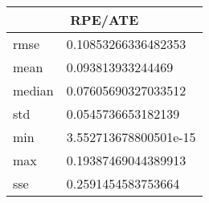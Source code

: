 \begin{table}[!ht] 
 \centering 
 \begin{tabular}{|l|l|} \hline 
 \multicolumn{2}{|c|}{RPE/ATE} \\ \hline 
 rmse & 0.10853266336482353 \\ \hline 
mean & 0.093813933244469 \\ \hline 
median & 0.07605690327033512 \\ \hline 
std & 0.0545736653182139 \\ \hline 
min & 3.552713678800501e-15 \\ \hline 
max & 0.19387469044389913 \\ \hline 
sse & 0.2591454583753664 \\ \hline 
\end{tabular} 
 \end{table}